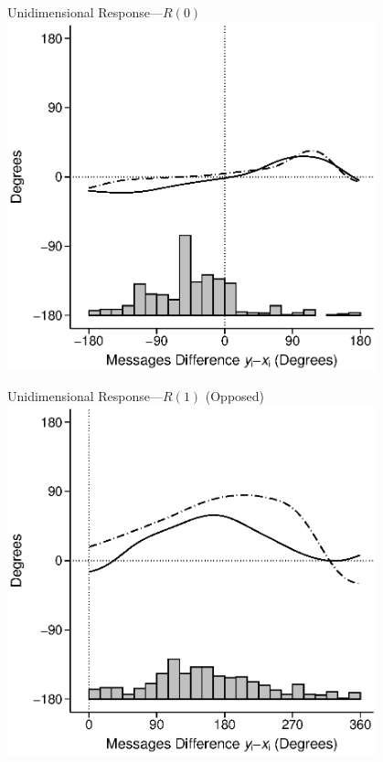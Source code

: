 \documentclass{beamer}
\begin{document}
\begin{frame}{Unidimensional Response---$R(0)$}
	\centering \includegraphics[width=0.8\textwidth]{./i/ConditionalChoiceWHist_AA_2.eps}
\end{frame}
\begin{frame}{Unidimensional Response---$R(1)$ (Opposed)}
	\centering \includegraphics[width=0.8\textwidth]{./i/ConditionalChoiceWHist_SR_1.eps}
\end{frame}
\end{document}
